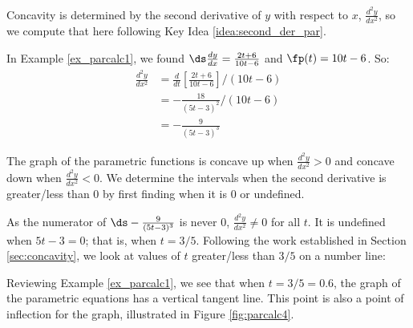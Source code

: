 {Concavity is determined by the second derivative of $y$ with respect to $x$, $\frac{d^2y}{dx^2}$, so we compute that here following Key Idea \ref{idea:second_der_par}.

In Example \ref{ex_parcalc1}, we found $\ds\frac{dy}{dx} = \frac{2t+6}{10t-6}$ and $\fp(t) = 10t-6$. So:
\begin{align*}
\frac{d^2y}{dx^2} &= \frac{d}{dt}\left[\frac{2t+6}{10t-6}\right]\Bigg/(10t-6) \\
				&= -\frac{18}{(5t-3)^2}\Bigg/(10t-6)\\
				&= -\frac{9}{(5t-3)^3}
\end{align*}

The graph of the parametric functions is concave up when $\frac{d^2y}{dx^2} > 0$ and concave down when $\frac{d^2y}{dx^2} <0$. We determine the intervals when the second derivative is greater/less than 0 by first finding when it is 0 or undefined.

As the numerator of $\ds -\frac{9}{(5t-3)^3}$ is never 0, $\frac{d^2y}{dx^2} \neq 0$ for all $t$. It is undefined when $5t-3=0$; that is, when $t= 3/5$. Following the work established in Section \ref{sec:concavity}, we look at values of $t$ greater/less than $3/5$ on a number line:

\begin{center}\end{center}

Reviewing Example \ref{ex_parcalc1}, we see that when $t=3/5=0.6$, the graph of the parametric equations has a vertical tangent line. This point is also a point of inflection for the graph, illustrated in Figure \ref{fig:parcalc4}.
}\\

